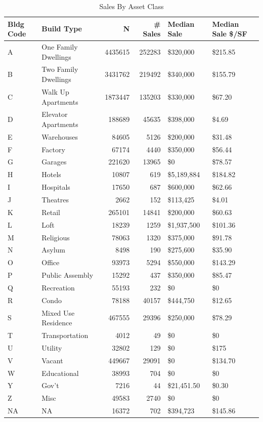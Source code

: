 \documentclass[12pt,]{article}
\begin{document}
\begin{table}

\caption{\label{tab:by_class}\label{tab:by_class} Sales By Asset Class}
\centering
\begin{tabular}[t]{llrrll}
\toprule
Bldg Code & Build Type & N & \# Sales & Median Sale & Median Sale \$/SF\\
\midrule
A & One Family Dwellings & 4435615 & 252283 & \$320,000 & \$215.85\\
B & Two Family Dwellings & 3431762 & 219492 & \$340,000 & \$155.79\\
C & Walk Up Apartments & 1873447 & 135203 & \$330,000 & \$67.20\\
D & Elevator Apartments & 188689 & 45635 & \$398,000 & \$4.69\\
E & Warehouses & 84605 & 5126 & \$200,000 & \$31.48\\
\addlinespace
F & Factory & 67174 & 4440 & \$350,000 & \$56.44\\
G & Garages & 221620 & 13965 & \$0 & \$78.57\\
H & Hotels & 10807 & 619 & \$5,189,884 & \$184.82\\
I & Hospitals & 17650 & 687 & \$600,000 & \$62.66\\
J & Theatres & 2662 & 152 & \$113,425 & \$4.01\\
\addlinespace
K & Retail & 265101 & 14841 & \$200,000 & \$60.63\\
L & Loft & 18239 & 1259 & \$1,937,500 & \$101.36\\
M & Religious & 78063 & 1320 & \$375,000 & \$91.78\\
N & Asylum & 8498 & 190 & \$275,600 & \$35.90\\
O & Office & 93973 & 5294 & \$550,000 & \$143.29\\
\addlinespace
P & Public Assembly & 15292 & 437 & \$350,000 & \$85.47\\
Q & Recreation & 55193 & 232 & \$0 & \$0\\
R & Condo & 78188 & 40157 & \$444,750 & \$12.65\\
S & Mixed Use Residence & 467555 & 29396 & \$250,000 & \$78.29\\
T & Transportation & 4012 & 49 & \$0 & \$0\\
\addlinespace
U & Utility & 32802 & 129 & \$0 & \$175\\
V & Vacant & 449667 & 29091 & \$0 & \$134.70\\
W & Educational & 38993 & 704 & \$0 & \$0\\
Y & Gov't & 7216 & 44 & \$21,451.50 & \$0.30\\
Z & Misc & 49583 & 2740 & \$0 & \$0\\
NA & NA & 16372 & 702 & \$394,723 & \$145.86\\
\bottomrule
\end{tabular}
\end{table}
\end{document}
